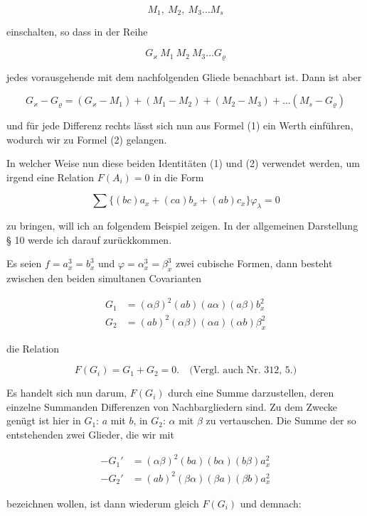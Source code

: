 \[ M_1, \ M_2, \ M_3 \ldots M_s \]

einschalten, so dass in der Reihe

\[ G_\varkappa \ M_1 \ M_2 \ M_3 \ldots G_\varrho \]

jedes vorausgehende mit dem nachfolgenden Gliede benachbart ist.
Dann ist aber

\[ G_\varkappa - G_\varrho = (G_\varkappa - M_1) + (M_1 - M_2) + (M_2 - M_3) + \ldots (M_s - G_\varrho) \]

und für jede Differenz rechts lässt sich nun aus Formel (1) ein Werth
einführen, wodurch wir zu Formel (2) gelangen.

In welcher Weise nun diese beiden Identitäten (1) und (2) verwendet
werden, um irgend eine Relation $F(A_i) = 0$ in die Form

\[ \sum \{(bc)a_x + (ca)b_x + (ab)c_x\}\varphi_\lambda = 0 \]

zu bringen, will ich an folgendem Beispiel zeigen. In der allgemeinen
Darstellung § 10 werde ich darauf zurückkommen.

Es seien $f = a_x^3 = b_x^3$ und $\varphi = \alpha_x^3 = \beta_x^3$ zwei cubische Formen,
dann besteht zwischen den beiden simultanen Covarianten

\[
\begin{aligned}
G_1 &{}= (\alpha\beta)^2 (ab)(a\alpha)(a\beta)b_x^2\\
G_2 &{}= (ab)^2 (\alpha\beta)(\alpha a)(\alpha b)\beta_x^2
\end{aligned}
\]

die Relation

\[ F(G_i) = G_1 + G_2 = 0. \quad \text{(Vergl. auch Nr. 312, 5.)} \]

Es handelt sich nun darum, $F(G_i)$ durch eine Summe darzustellen, deren
einzelne Summanden Differenzen von Nachbargliedern sind. Zu dem
Zwecke genügt ist hier in $G_1$: $a$ mit $b$, in $G_2$: $\alpha$ mit $\beta$ zu vertauschen.
Die Summe der so entstehenden zwei Glieder, die wir mit


\[
\begin{aligned}
-G_1' &{}= (\alpha\beta)^2 (ba)(b\alpha)(b\beta)a_x^2\\
-G_2' &{}= (ab)^2 (\beta\alpha)(\beta a)(\beta b)a_x^2
\end{aligned}
\]

bezeichnen wollen, ist dann wiederum gleich $F(G_i)$ und demnach:


